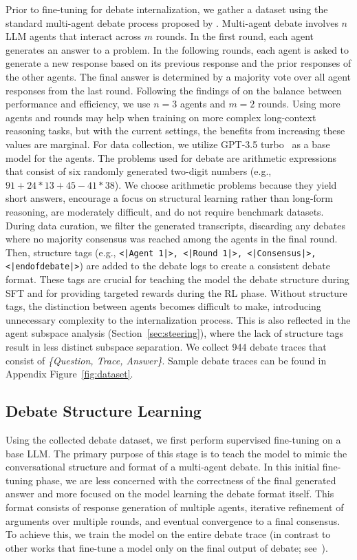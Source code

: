 \documentclass[11pt]{article}
\begin{document}
Prior to fine-tuning for debate internalization, we gather a dataset using the standard multi-agent debate process proposed by \citet{Du2023Improving}. Multi-agent debate involves $n$ LLM agents that interact across $m$ rounds. In the first round, each agent generates an answer to a problem. In the following rounds, each agent is asked to generate a new response based on its previous response and the prior responses of the other agents. The final answer is determined by a majority vote over all agent responses from the last round. 
Following the findings of \citet{Du2023Improving} on the balance between performance and efficiency, we use $n=3$ agents and $m=2$ rounds. 
Using more agents and rounds may help when training on more complex long-context reasoning tasks, but with the current settings, the benefits from increasing these values are marginal.
For data collection, we utilize GPT-3.5 turbo~\cite{Brown2020Language} as a base model for the agents. The problems used for debate are arithmetic expressions that consist of six randomly generated two-digit numbers (e.g., $91+24*13+45-41*38$). We choose arithmetic problems because they yield short answers, encourage a focus on structural learning rather than long-form reasoning, are moderately difficult, and do not require benchmark datasets.
During data curation, we filter the generated transcripts, discarding any debates where no majority consensus was reached among the agents in the final round. Then, structure tags (e.g., \texttt{<|Agent 1|>, <|Round 1|>, <|Consensus|>, <|endofdebate|>}) are added to the debate logs to create a consistent debate format. These tags are crucial for teaching the model the debate structure during SFT and for providing targeted rewards during the RL phase.  
Without structure tags, the distinction between agents becomes difficult to make, introducing unnecessary complexity to the internalization process. This is also reflected in the agent subspace analysis (Section~\ref{sec:steering}), where the lack of structure tags result in less distinct subspace separation.
We collect 944 debate traces that consist of \textit{\{Question, Trace, Answer\}}. Sample debate traces can be found in Appendix Figure~\ref{fig:dataset}. 

\subsection{Debate Structure Learning}
Using the collected debate dataset, we first perform supervised fine-tuning on a base LLM. The primary purpose of this stage is to teach the model to mimic the conversational structure and format of a multi-agent debate. In this initial fine-tuning phase, we are less concerned with the correctness of the final generated answer and more focused on the model learning the debate format itself. This format consists of response generation of multiple agents, iterative refinement of arguments over multiple rounds, and eventual convergence to a final consensus. To achieve this, we train the model on the entire debate trace (in contrast to other works that fine-tune a model only on the final output of debate; see~\citealp{subramaniam2025multiagent, srivastava2025debate}).
\end{document}
